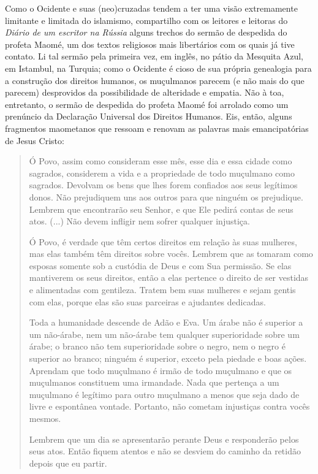 Como o Ocidente e suas (neo)cruzadas tendem a ter uma visão extremamente
limitante e limitada do islamismo, compartilho com os leitores e
leitoras do \emph{Diário de um escritor na Rússia} alguns trechos do
sermão de despedida do profeta Maomé, um dos textos religiosos mais
libertários com os quais já tive contato. Li tal sermão pela primeira
vez, em inglês, no pátio da Mesquita Azul, em Istambul, na Turquia; como
o Ocidente é cioso de sua própria genealogia para a construção dos
direitos humanos, os muçulmanos parecem (e não mais do que parecem)
desprovidos da possibilidade de alteridade e empatia. Não à toa,
entretanto, o sermão de despedida do profeta Maomé foi arrolado como um
prenúncio da Declaração Universal dos Direitos Humanos. Eis, então,
alguns fragmentos maometanos que ressoam e renovam as palavras mais
emancipatórias de Jesus Cristo:

\begin{quote}
Ó Povo, assim como consideram esse mês, esse dia e essa cidade como
sagrados, considerem a vida e a propriedade de todo muçulmano como
sagrados. Devolvam os bens que lhes forem confiados aos seus legítimos
donos. Não prejudiquem uns aos outros para que ninguém os prejudique.
Lembrem que encontrarão seu Senhor, e que Ele pedirá contas de seus
atos. (...) Não devem infligir nem sofrer qualquer injustiça.

Ó Povo, é verdade que têm certos direitos em relação às suas mulheres,
mas elas também têm direitos sobre vocês. Lembrem que as tomaram como
esposas somente sob a custódia de Deus e com Sua permissão. Se elas
mantiverem os seus direitos, então a elas pertence o direito de ser
vestidas e alimentadas com gentileza. Tratem bem suas mulheres e sejam
gentis com elas, porque elas são suas parceiras e ajudantes dedicadas.

Toda a humanidade descende de Adão e Eva. Um árabe não é superior a um
não-árabe, nem um não-árabe tem qualquer superioridade sobre um árabe; o
branco não tem superioridade sobre o negro, nem o negro é superior ao
branco; ninguém é superior, exceto pela piedade e boas ações. Aprendam
que todo muçulmano é irmão de todo muçulmano e que os muçulmanos
constituem uma irmandade. Nada que pertença a um muçulmano é legítimo
para outro muçulmano a menos que seja dado de livre e espontânea
vontade. Portanto, não cometam injustiças contra vocês mesmos.

Lembrem que um dia se apresentarão perante Deus e responderão pelos seus
atos. Então fiquem atentos e não se desviem do caminho da retidão depois
que eu partir.
\end{quote}


